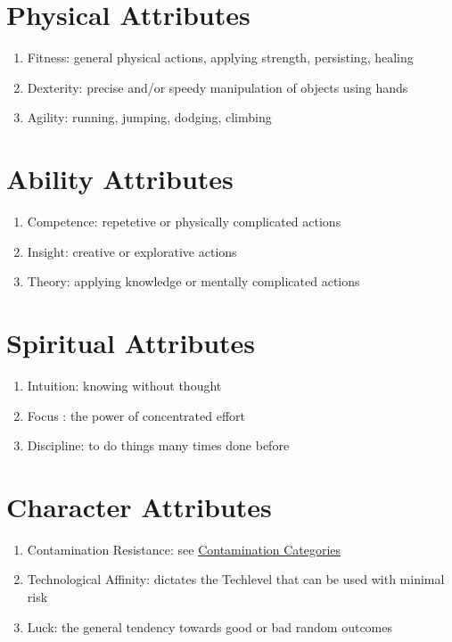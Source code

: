 \section{Physical Attributes}\label{sec:physical-attributes}
\begin{enumerate}[label= -]
    \item {Fitness}: general physical actions, applying strength, persisting, healing
    \item {Dexterity}: precise and/or speedy manipulation of objects using hands
    \item {Agility}: running, jumping, dodging, climbing
\end{enumerate}
\section{Ability Attributes}\label{sec:ability-attributes}
\begin{enumerate}[label= -]
    \item {Competence}: repetetive or physically complicated actions
    \item {Insight}: creative or explorative actions
    \item {Theory}: applying knowledge or mentally complicated actions
\end{enumerate}
\section{Spiritual Attributes}\label{sec:spiritual-attributes}
\begin{enumerate}[label= -]
    \item {Intuition}: knowing without thought
    \item {Focus} \label{itm:focus}: the power of concentrated effort
    \item {Discipline}: to do things many times done before
\end{enumerate}
\section{Character Attributes}\label{sec:character-attributes}
\begin{enumerate}[label= -]
    \item {Contamination Resistance}: see \hyperref[subsec:categories]{Contamination Categories}
    \item {Technological Affinity}: dictates the Techlevel that can be used with minimal risk
    \item {Luck}: the general tendency towards good or bad random outcomes
\end{enumerate}
